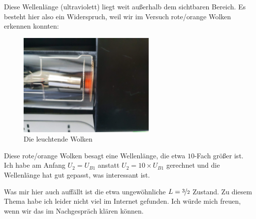 		Diese Wellenlänge (ultraviolett) liegt weit außerhalb dem sichtbaren Bereich. Es besteht hier also ein Widerspruch, weil wir im Versuch rote/orange Wolken erkennen konnten:
		\begin{figure}[!ht]
		    \centering
		    \includegraphics[width=0.6\textwidth]{./images/fhv-neon.jpg}
		    \caption{Die leuchtende Wolken}
		    \label{fig:fhv-neon}
		\end{figure}

		Diese rote/orange Wolken besagt eine Wellenlänge, die etwa $10$-Fach größer ist. Ich habe am Anfang $U_2 = U_{B1}$ anstatt $U_2 = 10\times U_{B1}$ gerechnet und die Wellenlänge hat gut gepasst, was interessant ist.

		Was mir hier auch auffällt ist die etwa ungewöhnliche $L = \nicefrac{3}{2}$ Zustand. Zu diesem Thema habe ich leider nicht viel im Internet gefunden. Ich würde mich freuen, wenn wir das im Nachgespräch klären können. 

